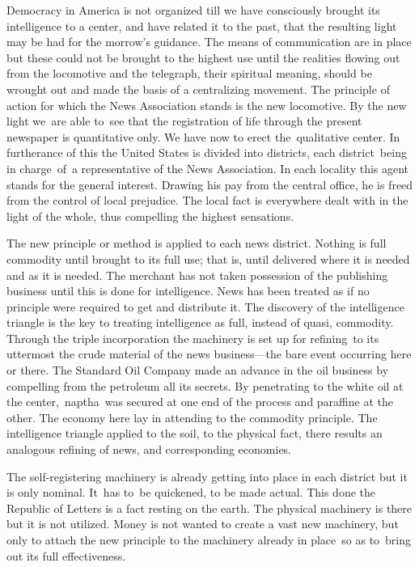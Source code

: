 \documentclass[openany,nobib]{tufte-book}
\begin{document}
Democracy in America is not organized till we have consciously brought
its intelligence to a center, and have related it to the past, that the
resulting light may be had for the morrow's guidance. The means of
communication are in place but these could not be brought to the highest
use until the realities flowing out from the locomotive and the
telegraph, their spiritual meaning, should be wrought out and made the
basis of a centralizing movement. The principle of action for which the
News Association stands is the new locomotive. By the new light we~are
able to~see that the registration of life through the present newspaper
is quantitative only. We have now to erect the~qualitative center. In
furtherance of this the United States is divided into districts, each
district~being in charge~of~a representative of the News Association. In
each locality this agent stands for the general interest. Drawing his
pay from the central office, he is freed from the control of local
prejudice. The local fact is everywhere dealt with in the light of the
whole, thus compelling the highest sensations. ~

The new principle or method is applied to each news district. Nothing is
full commodity until brought to its full use; that is, until delivered
where it is needed and as it is needed. The merchant has not taken
possession of the publishing business until this is done for
intelligence. News has been treated as if no principle were required to
get and distribute it. The discovery of the intelligence triangle is the
key to treating intelligence as full, instead of quasi, commodity.
Through the triple incorporation the machinery is set up for refining~to
its uttermost the crude material of the news business---the bare event
occurring here or there. The Standard Oil Company made an advance in the
oil business by compelling from the petroleum all its secrets. By
penetrating to the white oil at the center,~naptha~was secured at one
end of the process and paraffine at the other. The economy here lay in
attending to the commodity principle. The intelligence triangle applied
to the soil, to the physical fact, there results an analogous refining
of news, and corresponding economies.~

The self-registering machinery is already getting into place in each
district but it is only nominal. It~has to~be quickened, to be made
actual. This done the Republic of Letters is a fact resting on the
earth. The physical machinery is there but it is not utilized. Money is
not wanted to create a vast new machinery, but only to attach the new
principle to the machinery already in place~so as to~bring out its full
effectiveness.~
\end{document}
